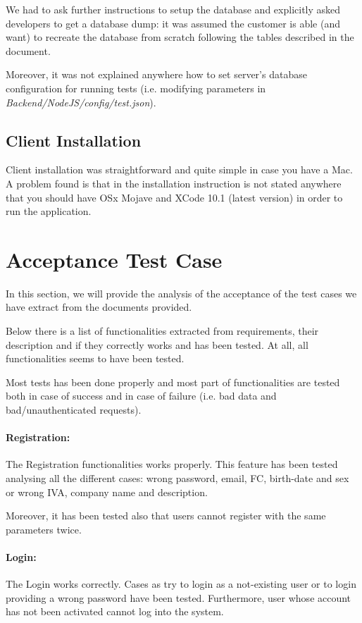 \documentclass[a4paper]{article}
\begin{document}
We had to ask further instructions to setup the database and explicitly asked developers to get a database dump: it was assumed the customer is able (and want) to recreate the database from scratch following the tables described in the document.

Moreover, it was not explained anywhere how to set server's database configuration for running tests (i.e. modifying parameters in \newline \textit{Backend/NodeJS/config/test.json}).

\subsection{Client Installation}
Client installation was straightforward and quite simple in case you have a Mac. A problem found is that in the installation instruction is not stated anywhere that you should have OSx Mojave and XCode 10.1 (latest version) in order to run the application.

\newpage
\section{Acceptance Test Case}
In this section, we will provide the analysis of the acceptance of the test cases we have extract from the documents provided. 

Below there is a list of functionalities extracted from requirements, their description and if they correctly works and has been tested. At all, all functionalities seems to have been tested.

Most tests has been done properly and most part of functionalities are tested both in case of success and in case of failure (i.e. bad data and bad/unauthenticated requests).

\paragraph{Registration:}
The Registration functionalities works properly. This feature has been tested analysing all the different cases: wrong password, email, FC, birth-date and sex or wrong IVA, company name and description.

Moreover, it has been tested also that users cannot register with the same parameters twice.

\paragraph{Login:}
The Login works correctly. Cases as try to login as a not-existing user or to login providing a wrong password have been tested. Furthermore, user whose account has not been activated cannot log into the system.
\end{document}
